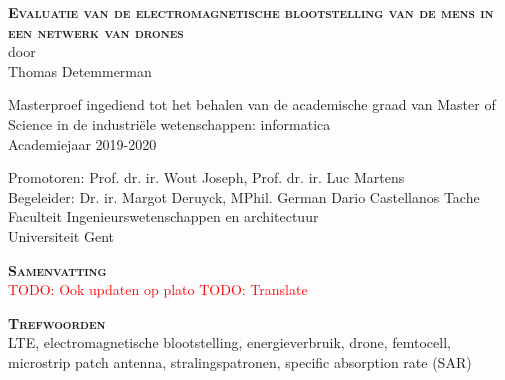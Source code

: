 \begin{center}
\textsc{\textbf{\Huge Evaluatie van de electromagnetische blootstelling van de mens in een netwerk van drones}}\\

door\\
Thomas Detemmerman

Masterproef ingediend tot het behalen van de academische graad van Master of Science in de
industri\"ele wetenschappen: informatica\\
Academiejaar 2019-2020

Promotoren: Prof. dr. ir. Wout Joseph, Prof. dr. ir. Luc Martens\\
Begeleider: Dr. ir. Margot Deruyck, MPhil. German Dario Castellanos Tache\\
Faculteit Ingenieurswetenschappen en architectuur\\
Universiteit Gent
\end{center}

\textsc{\textbf{\LARGE Samenvatting}}\\
\textcolor{red}{TODO: Ook updaten op plato}
\textcolor{red}{TODO: Translate}




\textsc{\textbf{\LARGE Trefwoorden}}\\

LTE, electromagnetische blootstelling, energieverbruik, drone, femtocell, microstrip patch antenna, stralingspatronen, specific absorption rate (SAR)

